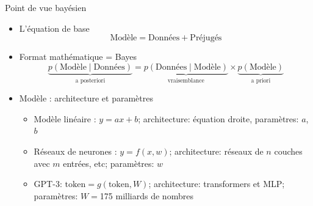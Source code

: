 \documentclass[presentation, aspectratio=169]{beamer}
\begin{document}
\begin{frame}{Point de vue bayésien}
  \begin{itemize}
  \item L'équation de base
    \begin{equation*}
      \text{Modèle} = \text{Données} + \text{Préjugés}
    \end{equation*}
  \item Format mathématique = Bayes
    \begin{equation*}
      \underbrace{p(\text{Modèle}\mid \text{Données})}_{\text{a posteriori}}
        = \underbrace{p(\text{Données}\mid\text{Modèle})}_{\text{vraisemblance}}
        \times
        \underbrace{p(\text{Modèle})}_{\text{a priori}}
    \end{equation*}
  \item Modèle : architecture et paramètres
    \begin{itemize}
    \item Modèle linéaire : $y = ax+b$; architecture:
      équation droite, paramètres: $a$, $b$
    \item Réseaux de neurones : $y = f(x, w)$; architecture: réseaux
      de $n$ couches avec $m$ entrées, etc; paramètres: $w$
    \item GPT-3: $\text{token} = g(\text{token}, W)$; architecture:
      transformers et MLP; paramètres: $W = $175 milliards de nombres
    \end{itemize}
  \end{itemize}
\end{frame}
\end{document}
